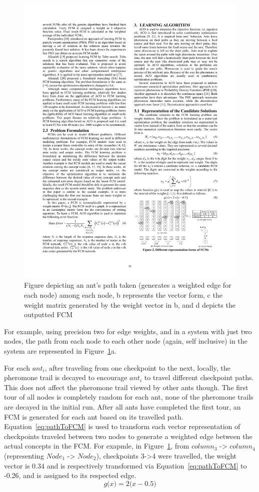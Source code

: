 \documentclass{umm-senior-sem}
\begin{document}
\begin{figure}
\label{fig:antPath}
\includegraphics[scale=1]{images/antPath.pdf}
\caption{Figure depicting an ant's path taken (generates a weighted edge for each node) among each node, b represents the vector form, c the weight matrix generated by the weight vector in b, and d depicts the outputted FCM~\cite{main:2012}}
\end{figure}
For example, using precision two for edge weights, and in a system with just two nodes, the path from each node to each other node (again, self inclusive) in the system are represented in Figure~\ref{fig:antPath}a.


For each $ant_i$, after traveling from one checkpoint to the next, locally, the pheromone trail is decayed to encourage $ant_i$ to travel different checkpoint paths. This does not affect the pheromone trail viewed by other ants though. The first tour of all nodes is completely random for each ant, none of the pheromone trails are decayed in the initial run. After all ants have completed the first tour, an FCM is generated for each ant based on its travelled path. Equation~\ref{eq:pathToFCM} is used to transform each vector representation of checkpoints traveled between two nodes to generate a weighted edge between the actual concepts in the FCM. For exapmle,  in Figure~\ref{fig:antPath}, from $column_3$ -> $column_4$ (representing $Node_1$ -> $Node_2$), checkpoints 3->4 were travelled, the weight vector is 0.34 and is respectively transformed via Equation~\ref{eq:pathToFCM} to -0.26,  and is assigned to its respected edge.
\begin{equation}
\label{eq:pathToFCM}
g\big(x\big) = 2 \big(x-0.5\big) 
\end{equation}
\end{document}
